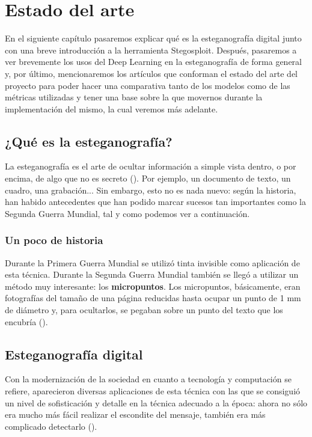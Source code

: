 \chapter{Estado del arte}
\label{ch:sota}

En el siguiente capítulo pasaremos explicar qué es la esteganografía digital junto con una breve introducción a la herramienta Stegosploit. Después, pasaremos a ver brevemente los usos del Deep Learning en la esteganografía de forma general y, por último, mencionaremos los artículos que conforman el estado del arte del proyecto para poder hacer una comparativa tanto de los modelos como de las métricas utilizadas y tener una base sobre la que movernos durante la implementación del mismo, la cual veremos más adelante.

\section{¿Qué es la esteganografía?}

La esteganografía es el arte de ocultar información a simple vista dentro, o por encima, de algo que no es secreto (\cite{esteganografia-digital}). Por ejemplo, un documento de texto, un cuadro, una grabación... Sin embargo, esto no es nada nuevo: según la historia, han habido antecedentes que han podido marcar sucesos tan importantes como la Segunda Guerra Mundial, tal y como podemos ver a continuación.%

\subsection{Un poco de historia}

Durante la Primera Guerra Mundial se utilizó tinta invisible como aplicación de esta técnica. Durante la Segunda Guerra Mundial también se llegó a utilizar un método muy interesante: los \textbf{micropuntos}. Los micropuntos, básicamente, eran fotografías del tamaño de una página reducidas hasta ocupar un punto de 1 mm de diámetro y, para ocultarlos, se pegaban sobre un punto del texto que los encubría (\cite{cera-micropuntos}). %

\section{Esteganografía digital}

Con la modernización de la sociedad en cuanto a tecnología y computación se refiere, aparecieron diversas aplicaciones de esta técnica con las que se consiguió un nivel de sofisticación y detalle en la técnica adecuado a la época: ahora no sólo era mucho más fácil realizar el escondite del mensaje, también era más complicado detectarlo (\cite{esteganografia-digital}). %

